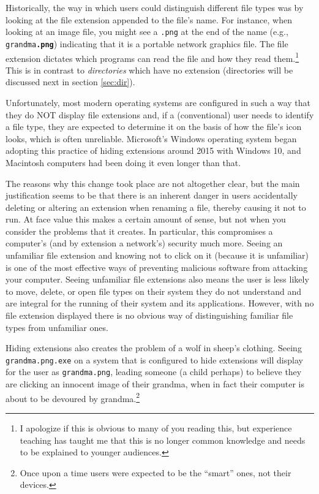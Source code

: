 Historically, the way in which users could distinguish different file types was by looking at the \gls{file extension} appended to the file's name. For instance, when looking at an image file, you might see a \texttt{.png} at the end of the name (e.g., \texttt{grandma\textbf{.png}}) indicating that it is a portable network graphics file. The file extension dictates which programs can read the file and how they read them.\footnote{I apologize if this is obvious to many of you reading this, but experience teaching has taught me that this is no longer common knowledge and needs to be explained to younger audiences.} This is in contrast to \textit{directories} which have no extension (directories will be discussed next in section \ref{sec:dir}).

Unfortunately, most modern operating systems are configured in such a way that they do NOT display file extensions and, if a (conventional) user needs to identify a file type, they are expected to determine it on the basis of how the file's icon looks, which is often unreliable. Microsoft's Windows operating system began adopting this practice of hiding extensions around 2015 with Windows 10, and Macintosh computers had been doing it even longer than that.

The reasons why this change took place are not altogether clear, but the main justification seems to be that there is an inherent danger in users accidentally deleting or altering an extension when renaming a file, thereby causing it not to run. At face value this makes a certain amount of sense, but not when you consider the problems that it creates. In particular, this compromises a computer's (and by extension a network's) security much more. Seeing an unfamiliar file extension and knowing not to click on it (because it is unfamiliar) is one of the most effective ways of preventing malicious software from attacking your computer. Seeing unfamiliar file extensions also means the user is less likely to move, delete, or open file types on their system they do not understand and are integral for the running of their system and its applications. However, with no file extension displayed there is no obvious way of distinguishing familiar file types from unfamiliar ones.

Hiding extensions also creates the problem of a wolf in sheep's clothing. Seeing \texttt{grandma.png.exe} on a system that is configured to hide extensions will display for the user as \texttt{grandma.png}, leading someone (a child perhaps) to believe they are clicking an innocent image of their grandma, when in fact their computer is about to be devoured by grandma.\footnote{Once upon a time users were expected to be the ``smart'' ones, not their devices.}


